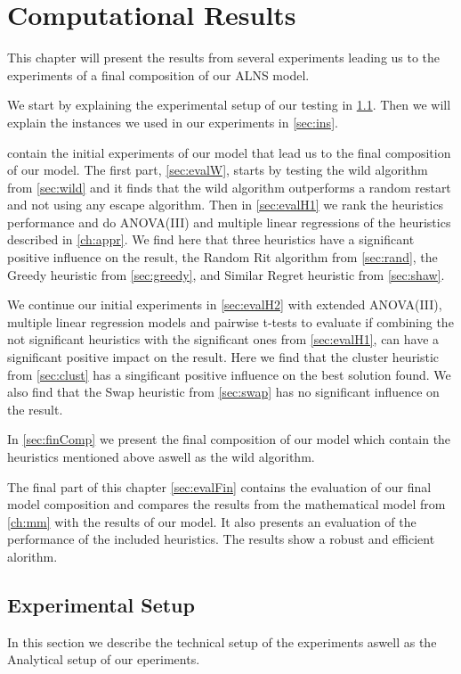 \documentclass[../main.tex]{subfiles}
\begin{document}
                                                
\chapter{Computational Results}
\label{ch:res}
This chapter will present the results from several experiments leading us to the experiments of a final composition of our ALNS model. \par 
We start by explaining the experimental setup of our testing in \cref{sec:setup}. Then we will explain the instances we used in our experiments in \cref{sec:ins}. \par
{} contain the initial experiments of our model that lead us to the final composition of our model. 
The first part, \cref{sec:evalW}, starts by testing the wild algorithm from \cref{sec:wild} and it finds that the wild algorithm outperforms a random restart and not using any escape algorithm.
Then in \cref{sec:evalH1} we rank the heuristics performance and do ANOVA(III) and multiple linear regressions of the heuristics described in \cref{ch:appr}. 
We find here that three heuristics have a significant positive influence on the result, the Random Rit algorithm from \cref{sec:rand}, the Greedy heuristic from \cref{sec:greedy}, and Similar Regret heuristic from \cref{sec:shaw}. \par
We continue our initial experiments in \cref{sec:evalH2} with extended ANOVA(III), multiple linear regression models and pairwise t-tests to evaluate if combining the not significant heuristics with the significant ones from \cref{sec:evalH1}, can have a significant positive impact on the result.
Here we find that the cluster heuristic from \cref{sec:clust} has a singificant positive influence on the best solution found. 
We also find that the Swap heuristic from \cref{sec:swap} has no significant influence on the result. \par
In \cref{sec:finComp} we present the final composition of our model which contain the heuristics mentioned above aswell as the wild algorithm.\par
The final part of this chapter \cref{sec:evalFin} contains the evaluation of our final model composition and compares the results from the mathematical model from \cref{ch:mm} with the results of our model. It also presents an evaluation of the performance of the included heuristics.
The results show a robust and efficient alorithm.

\section{Experimental Setup}
\label{sec:setup}
In this section we describe the technical setup of the experiments aswell as the Analytical setup of our eperiments.
\end{document}
